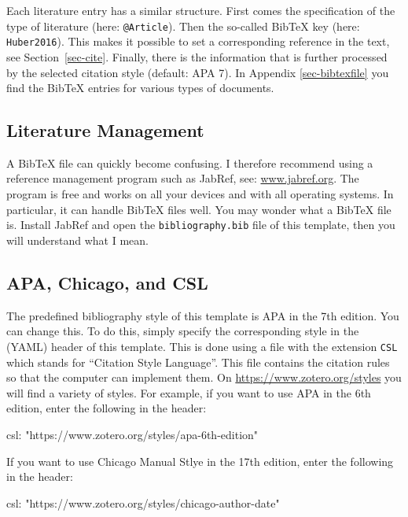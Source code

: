 \documentclass[
  stu,
  floatsintext,
  longtable,
  a4paper,
  nolmodern,
  notxfonts,
  notimes,
  colorlinks=true,linkcolor=black,citecolor=black,urlcolor=black]{apa7}
\newenvironment{Shaded}{\begin{snugshade}}{\end{snugshade}}
\newcommand{\NormalTok}[1]{\textcolor[rgb]{0.00,0.23,0.31}{#1}}
\begin{document}
Each literature entry has a similar structure. First comes the
specification of the type of literature (here: \texttt{@Article}). Then
the so-called BibTeX key (here: \texttt{Huber2016}). This makes it
possible to set a corresponding reference in the text, see
Section~\ref{sec-cite}. Finally, there is the information that is
further processed by the selected citation style (default: APA 7). In
Appendix \ref{sec-bibtexfile} you find the BibTeX entries for various
types of documents.

\subsection{Literature Management}\label{sec-jabref}

A BibTeX file can quickly become confusing. I therefore recommend using
a reference management program such as JabRef, see:
\url{www.jabref.org}. The program is free and works on all your devices
and with all operating systems. In particular, it can handle BibTeX
files well. You may wonder what a BibTeX file is. Install JabRef and
open the \texttt{bibliography.bib} file of this template, then you will
understand what I mean.

\subsection{APA, Chicago, and CSL}\label{sec-apa}

The predefined bibliography style of this template is APA in the 7th
edition. You can change this. To do this, simply specify the
corresponding style in the (YAML) header of this template. This is done
using a file with the extension \texttt{CSL} which stands for ``Citation
Style Language''. This file contains the citation rules so that the
computer can implement them. On \url{https://www.zotero.org/styles} you
will find a variety of styles. For example, if you want to use APA in
the 6th edition, enter the following in the header:

\begin{Shaded}
\begin{Highlighting}[]
\NormalTok{csl: "https://www.zotero.org/styles/apa{-}6th{-}edition"}
\end{Highlighting}
\end{Shaded}

If you want to use Chicago Manual Stlye in the 17th edition, enter the
following in the header:

\begin{Shaded}
\begin{Highlighting}[]
\NormalTok{csl: "https://www.zotero.org/styles/chicago{-}author{-}date" }
\end{Highlighting}
\end{Shaded}
\end{document}
